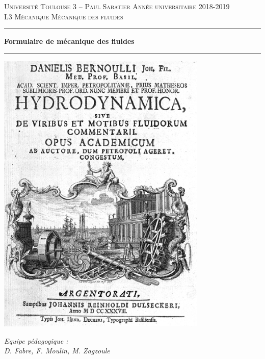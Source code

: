\documentclass[10pt, a4paper]{article}
\begin{document}
                                          

\begin{titlepage}

\noindent
\textsc{Universit\'e Toulouse 3 -- Paul Sabatier \hfill Ann\'ee universitaire 2018-2019}
\\
\textsc{L3 M\'ecanique \hfill M\'ecanique des fluides}

\vspace{1cm}

\begin{center}
  \setlength{\unitlength}{1mm}
  \hrule height 1mm
  \vspace{6mm}
  \textbf{\LARGE Formulaire de mécanique des fluides}
  \\ \vspace{5mm}
  \hrule height 1mm
  \vspace{2cm}
  \includegraphics[width=10cm]{bernoulli}
\end{center}

\vfill

\begin{flushright}
  \large{\textsl{Equipe p\'edagogique : \\
      D. Fabre, F. Moulin, M. Zagzoule}}
\end{flushright}

\end{titlepage}

\tableofcontents

%
%
%
%
%
%
%


\end{document}
